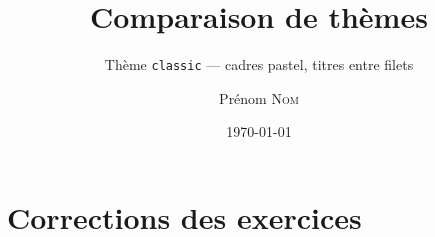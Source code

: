 \documentclass[11pt]{ocots-book}
\title{Comparaison de thèmes}
\subtitle{Thème \texttt{classic} — cadres pastel, titres entre filets}
\author{Prénom \textsc{Nom}}
\date{\today}
\begin{document}
\maketitle

\ocotscollectsolutions%





\chapter{Corrections des exercices}
\ocotsprintsolutions%



\end{document}
